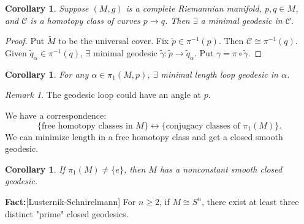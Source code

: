 \documentclass[11pt, a4paper]{article}
\theoremstyle{plain}
\newtheorem{corollary}[theorem]{Corollary}
\theoremstyle{definition}
\theoremstyle{remark}
\newtheorem{remark}[theorem]{Remark}
\begin{document}
{\begin{corollary}
Suppose $(M, g)$ is a complete Riemannian manifold, $p, q \in M$, and $\mathcal{C}$ is a homotopy class of curves $p \to q$. Then $\exists$ a minimal geodesic in $\mathcal{C}$.
\end{corollary}

\begin{proof}
Put $\tilde{M}$ to be the universal cover. Fix $\tilde{p} \in \pi^{-1}(p)$. Then $\mathcal{C} \cong \pi^{-1}(q)$. Given $\tilde{q}_\alpha \in \pi^{-1}(q)$, $\exists$ minimal geodesic $\tilde{\gamma}: \tilde{p} \to \tilde{q}_\alpha$. Put $\gamma = \pi \circ \tilde{\gamma}$.
\end{proof}

\begin{corollary}
For any $\alpha \in \pi_1(M, p)$, $\exists$ minimal length loop geodesic in $\alpha$.
\end{corollary}

\begin{remark}
The geodesic loop could have an angle at $p$.
\end{remark}

We have a correspondence:
\[
\{\text{free homotopy classes in } M\} \longleftrightarrow \{\text{conjugacy classes of } \pi_1(M)\}.
\]
We can minimize length in a free homotopy class and get a closed smooth geodesic.

\begin{corollary}
If $\pi_1(M) \neq \{e\}$, then $M$ has a nonconstant smooth closed geodesic.
\end{corollary}

\noindent\textbf{Fact:}[Lusternik-Schnirelmann]
For $n \ge 2$, if $M \cong S^n$, there exist at least three distinct "prime" closed geodesics.


}
\end{document}
